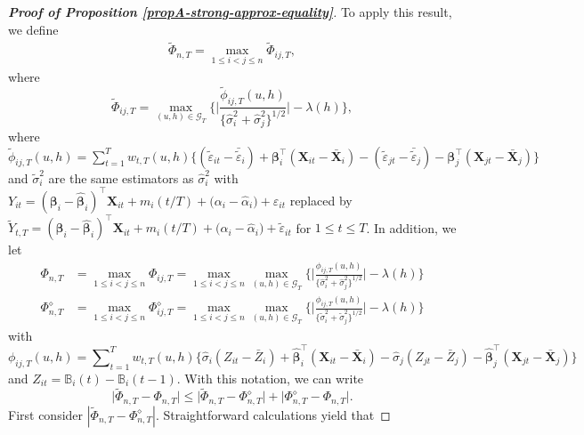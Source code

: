 \documentclass[a4paper,12pt]{article}
\begin{document}
\begin{proof}[\textnormal{\textbf{Proof of Proposition \ref{propA-strong-approx-equality}}}]
To apply this result, we define 
\begin{align}\label{Phi-tilde-statistic}
\widetilde{\Phi}_{n,T} = \max_{1 \le i < j \le n} \widetilde{\Phi}_{ij,T},
\end{align}
where
\[ \widetilde{\Phi}_{ij, T} = \max_{(u,h) \in \mathcal{G}_T} \Big\{ \Big|\frac{\widetilde{\phi}_{ij, T}(u,h)}{\{\widehat{\sigma}_i^2 + \widehat{\sigma}_j^2 \}^{1/2}} \Big| - \lambda(h) \Big\}, \]
where $\widetilde{\phi}_{ij, T}(u,h) = \sum\nolimits_{t=1}^T w_{t,T}(u,h) \big\{ (\widetilde{\varepsilon}_{it} - \bar{\widetilde{\varepsilon}}_i) + \bm{\beta}_i^\top (\mathbf{X}_{it} - \bar{\mathbf{X}}_{i}) - (\widetilde{\varepsilon}_{jt} - \bar{\widetilde{\varepsilon}}_j) -\bm{\beta}_j^\top (\mathbf{X}_{jt} - \bar{\mathbf{X}}_{j}) \big\}$ and $\widetilde{\sigma}^2_i$ are the same estimators as $\widehat{\sigma}^2_i$ with $Y_{it} = 
(\bm{\beta}_i - \widehat{\bm{\beta}}_i)^\top \mathbf{X}_{it} + m_i ( t/T) + \big( \alpha_i - \widehat{\alpha}_i \big) + \varepsilon_{it}$
replaced by $\widetilde{Y}_{t,T} = 
(\bm{\beta}_i - \widehat{\bm{\beta}}_i)^\top \mathbf{X}_{it} + m_i(t/T) + \big( \alpha_i - \widehat{\alpha}_i \big) + \widetilde{\varepsilon}_{it}$  for $1 \le t \le T$. In addition, we let
\begin{align*}
\Phi_{n, T} & = \max_{1\leq i < j \leq n} \Phi_{ij, T}= \max_{1\leq i < j \leq n} \max_{(u,h) \in \mathcal{G}_T} \Big\{ \Big|\frac{\phi_{ij, T}(u,h)}{\{\widehat{\sigma}_i^2 + \widehat{\sigma}_j^2 \}^{1/2}}\Big| - \lambda(h) \Big\} \\
\Phi_{n, T}^{\diamond} & =\max_{1\leq i < j \leq n} \Phi_{ij, T}^{\diamond} = \max_{1\leq i< j \leq n}\max_{(u,h) \in \mathcal{G}_T} \Big\{ \Big|\frac{\phi_{ij, T}(u,h)}{\{\widetilde{\sigma}_i^2 + \widetilde{\sigma}_j^2 \}^{1/2}}\Big| - \lambda(h) \Big\} 
\end{align*}
with $$\phi_{ij, T}(u,h) = \sum\nolimits_{t=1}^T w_{t,T}(u,h) \big\{ \widehat{\sigma}_i (Z_{it} - \bar{Z}_i) + \widehat{\bm{\beta}}_i^\top (\mathbf{X}_{it} - \bar{\mathbf{X}}_{i}) - \widehat{\sigma}_j (Z_{jt} - \bar{Z}_j) - \widehat{\bm{\beta}}_j^\top (\mathbf{X}_{jt} - \bar{\mathbf{X}}_{j}) \big\}$$ and $Z_{it} = \mathbb{B}_i(t) - \mathbb{B}_i(t-1)$. With this notation, we can write 
\begin{equation}\label{eq-strongapprox-bound1}
\big| \widetilde{\Phi}_{n, T} - \Phi_{n, T} \big| \le \big| \widetilde{\Phi}_{n, T} - \Phi_{n, T}^{\diamond} \big| + \big| \Phi_{n, T}^{\diamond} - \Phi_{n, T} \big|. 
\end{equation}
First consider $|\widetilde{\Phi}_{n, T} - \Phi_{n, T}^{\diamond}|$. Straightforward calculations yield that 

\end{proof}
\end{document}
